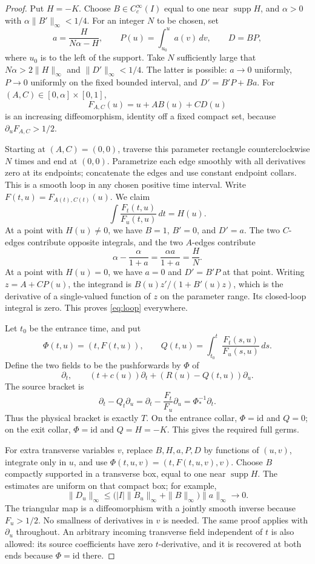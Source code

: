 \documentclass[11pt]{article}
\theoremstyle{remark}
\begin{document}
\begin{proof}
Put $H=-K$. Choose $B\in C_c^\infty(I)$ equal to one near $\operatorname{supp}H$, and $\alpha>0$ with $\alpha\|B'\|_\infty<1/4$. For an integer $N$ to be chosen, set
$$
 a=\frac{H}{N\alpha-H},\qquad
 P(u)=\int_{u_0}^u a(v)\,dv,\qquad D=BP,
$$
where $u_0$ is to the left of the support. Take $N$ sufficiently large that $N\alpha>2\|H\|_\infty$ and $\|D'\|_\infty<1/4$. The latter is possible: $a\to0$ uniformly, $P\to0$ uniformly on the fixed bounded interval, and $D'=B'P+Ba$. For $(A,C)\in[0,\alpha]\times[0,1]$,
$$
 F_{A,C}(u)=u+AB(u)+CD(u)
$$
is an increasing diffeomorphism, identity off a fixed compact set, because $\partial_uF_{A,C}>1/2$.

Starting at $(A,C)=(0,0)$, traverse this parameter rectangle counterclockwise $N$ times and end at $(0,0)$. Parametrize each edge smoothly with all derivatives zero at its endpoints; concatenate the edges and use constant endpoint collars. This is a smooth loop in any chosen positive time interval. Write $F(t,u)=F_{A(t),C(t)}(u)$. We claim
\begin{equation}
    \int \frac{F_t(t,u)}{F_u(t,u)}\,dt=H(u). \tag{3.1}\label{eq:loop}
\end{equation}
At a point with $H(u)\ne0$, we have $B=1$, $B'=0$, and $D'=a$. The two $C$-edges contribute opposite integrals, and the two $A$-edges contribute
$$
 \alpha-\frac{\alpha}{1+a}=\frac{\alpha a}{1+a}=\frac{H}{N}.
$$
At a point with $H(u)=0$, we have $a=0$ and $D'=B'P$ at that point. Writing $z=A+CP(u)$, the integrand is $B(u)z'/(1+B'(u)z)$, which is the derivative of a single-valued function of $z$ on the parameter range. Its closed-loop integral is zero.
This proves \eqref{eq:loop} everywhere.

Let $t_0$ be the entrance time, and put
$$
 \Phi(t,u)=(t,F(t,u)),\qquad
 Q(t,u)=\int_{t_0}^t\frac{F_t(s,u)}{F_u(s,u)}\,ds.
$$
Define the two fields to be the pushforwards by $\Phi$ of
$$
 \partial_t,\qquad
 (t+c(u))\partial_t+(R(u)-Q(t,u))\partial_u.
$$
The source bracket is
$$
 \partial_t-Q_t\partial_u
 =\partial_t-\frac{F_t}{F_u}\partial_u
 =\Phi^{-1}_*\partial_t.
$$
Thus the physical bracket is exactly $T$. On the entrance collar, $\Phi=\mathrm{id}$ and $Q=0$; on the exit collar, $\Phi=\mathrm{id}$ and $Q=H=-K$. This gives the required full germs.

For extra transverse variables $v$, replace $B,H,a,P,D$ by functions of $(u,v)$, integrate only in $u$, and use $\Phi(t,u,v)=(t,F(t,u,v),v)$. Choose $B$ compactly supported in a transverse box, equal to one near $\operatorname{supp}H$. The estimates are uniform on that compact box; for example,
$$
 \|D_u\|_\infty\le
 \bigl(|I|\|B_u\|_\infty+\|B\|_\infty\bigr)\|a\|_\infty
 \longrightarrow0.
$$ The triangular map is a diffeomorphism with a jointly smooth inverse because $F_u>1/2$. No smallness of derivatives in $v$ is needed. The same proof applies with $\partial_u$ throughout. An arbitrary incoming transverse field independent of $t$ is also allowed: its source coefficients have zero $t$-derivative, and it is recovered at both ends because $\Phi=\mathrm{id}$ there.
\end{proof}
\end{document}
